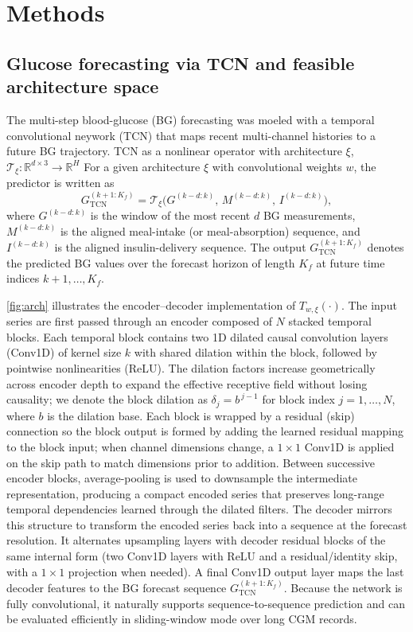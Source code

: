 \documentclass[preprint,12pt]{elsarticle}
\begin{document}
\section{Methods}\label{sec:methods}

\subsection{Glucose forecasting via TCN and feasible architecture space}
\label{sec:tcn}

The multi-step blood-glucose (BG) forecasting was moeled with a temporal convolutional neywork (TCN)\cite{bai2018empirical} that maps recent multi-channel histories to a future BG trajectory. 
TCN as a nonlinear operator with architecture $\xi$, $\mathcal{T}_{\xi}: \mathbb{R}^{d\times 3} \rightarrow \mathbb{R}^H$
For a given architecture $\xi$ with convolutional weights $w$, the predictor is written as
\[
G^{(k+1:K_f)}_{\mathrm{TCN}} = \mathcal{T}_{\xi}\!\big(G^{(k-d:k)},\, M^{(k-d:k)},\, I^{(k-d:k)}\big),
\]
where $G^{(k-d:k)}$ is the window of the most recent $d$ BG measurements, $M^{(k-d:k)}$ is the aligned meal-intake (or meal-absorption) sequence, and $I^{(k-d:k)}$ is the aligned insulin-delivery sequence. The output $G^{(k+1:K_f)}_{\mathrm{TCN}}$ denotes the predicted BG values over the forecast horizon of length $K_f$ at future time indices $k+1,\ldots,K_f$.

\autoref{fig:arch} illustrates the encoder--decoder implementation of $T_{w,\xi}(\cdot)$. The input series are first passed through an encoder composed of $N$ stacked temporal blocks. Each temporal block contains two 1D dilated causal convolution layers (Conv1D) of kernel size $k$ with shared dilation within the block, followed by pointwise nonlinearities (ReLU). The dilation factors increase geometrically across encoder depth to expand the effective receptive field without losing causality; we denote the block dilation as $\delta_j=b^{\,j-1}$ for block index $j=1,\ldots,N$, where $b$ is the dilation base. Each block is wrapped by a residual (skip) connection so the block output is formed by adding the learned residual mapping to the block input; when channel dimensions change, a $1\times 1$ Conv1D is applied on the skip path to match dimensions prior to addition. Between successive encoder blocks, average-pooling is used to downsample the intermediate representation, producing a compact encoded series that preserves long-range temporal dependencies learned through the dilated filters. The decoder mirrors this structure to transform the encoded series back into a sequence at the forecast resolution. It alternates upsampling layers with decoder residual blocks of the same internal form (two Conv1D layers with ReLU and a residual/identity skip, with a $1\times 1$ projection when needed). A final Conv1D output layer maps the last decoder features to the BG forecast sequence $G^{(k+1:K_f)}_{\mathrm{TCN}}$. Because the network is fully convolutional, it naturally supports sequence-to-sequence prediction and can be evaluated efficiently in sliding-window mode over long CGM records.
\end{document}

